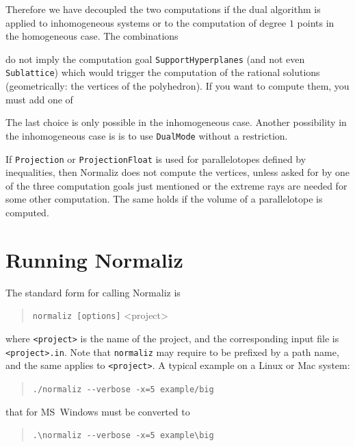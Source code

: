 Therefore we have decoupled the two computations if the dual algorithm is applied to inhomogeneous systems or to the computation of degree $1$ points in the homogeneous case. The combinations
\begin{itemize}
	
	
	
	
\end{itemize}
do not imply the computation goal \verb|SupportHyperplanes| (and not even \verb|Sublattice|) which would trigger the computation of the rational solutions (geometrically: the vertices of the polyhedron). If you want to compute them, you must add one of
\begin{itemize}
	\itemtt[SupportHyperplanes, -s]
	
	\itemtt[ExtremeRays]
	
	\itemtt[VerticesOfPolyhedron]
\end{itemize}
The last choice is only possible in the inhomogeneous case. Another possibility in the inhomogeneous case is is to use \verb|DualMode| without a restriction.

If \verb|Projection| or \verb|ProjectionFloat| is used for parallelotopes defined by inequalities, then Normaliz does not compute the vertices, unless asked for by one of the three computation goals just mentioned or the extreme rays are needed for some other computation. The same holds if the volume of a parallelotope is computed.
\section{Running Normaliz}\label{options}

The standard form for calling Normaliz is
\begin{quote}
	\verb|normaliz [options]| <project>
\end{quote}
where \verb|<project>| is the name of the project, and the corresponding input file is \verb|<project>.in|. Note that \verb|normaliz| may require to be prefixed by a path name, and the same applies to \verb|<project>|. A typical example on a Linux or Mac system:
\begin{quote}
	\verb|./normaliz --verbose -x=5 example/big|
\end{quote}
that for MS~Windows must be converted to
\begin{quote}
	\verb|.\normaliz --verbose -x=5 example\big|
\end{quote}

